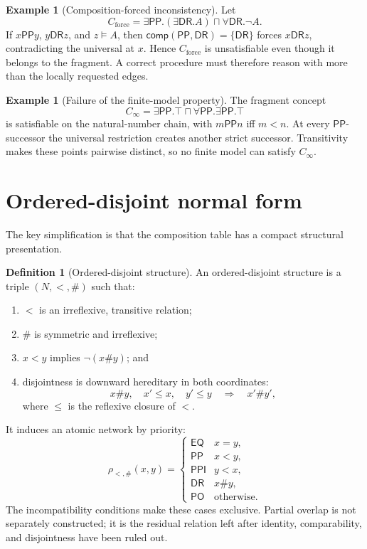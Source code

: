 \documentclass[11pt]{article}
\theoremstyle{plain}
\theoremstyle{definition}
\newtheorem{definition}[theorem]{Definition}
\newtheorem{example}[theorem]{Example}
\theoremstyle{remark}
\newcommand{\EQ}{\ensuremath{\mathsf{EQ}}}
\newcommand{\PP}{\ensuremath{\mathsf{PP}}}
\newcommand{\PPI}{\ensuremath{\mathsf{PPI}}}
\newcommand{\PO}{\ensuremath{\mathsf{PO}}}
\newcommand{\DR}{\ensuremath{\mathsf{DR}}}
\newcommand{\comp}{\ensuremath{\mathsf{comp}}}
\begin{document}
\begin{example}[Composition-forced inconsistency]
Let
\[
 C_{\mathrm{force}}=
   \exists\PP.(\exists\DR.A)\sqcap\forall\DR.\neg A.
\]
If $x\PP y$, $y\DR z$, and $z\models A$, then
$\comp(\PP,\DR)=\{\DR\}$ forces $x\DR z$, contradicting the universal at
$x$.  Hence $C_{\mathrm{force}}$ is unsatisfiable even though it belongs to
the fragment.  A correct procedure must therefore reason with more than the
locally requested edges.
\end{example}

\begin{example}[Failure of the finite-model property]
The fragment concept
\[
 C_{\infty}=\exists\PP.\top\sqcap\forall\PP.\exists\PP.\top
\]
is satisfiable on the natural-number chain, with $m\PP n$ iff $m<n$.
At every $\PP$-successor the universal restriction creates another strict
successor.  Transitivity makes these points pairwise distinct, so no finite
model can satisfy $C_{\infty}$.
\end{example}

\section{Ordered-disjoint normal form}
\label{sec:od}

The key simplification is that the composition table has a compact structural
presentation.

\begin{definition}[Ordered-disjoint structure]
An ordered-disjoint structure is a triple $(N,<,\#)$ such that:
\begin{enumerate}
  \item $<$ is an irreflexive, transitive relation;
  \item $\#$ is symmetric and irreflexive;
  \item $x<y$ implies $\neg(x\#y)$; and
  \item disjointness is downward hereditary in both coordinates:
  \[
      x\#y,\quad x'\leq x,\quad y'\leq y
      \quad\Longrightarrow\quad x'\#y',
  \]
  where $\leq$ is the reflexive closure of $<$.
\end{enumerate}
\end{definition}

It induces an atomic network by priority:
\[
 \rho_{<,\#}(x,y)=
 \begin{cases}
   \EQ  & x=y,\\
   \PP  & x<y,\\
   \PPI & y<x,\\
   \DR  & x\#y,\\
   \PO  & \text{otherwise.}
 \end{cases}
\]
The incompatibility conditions make these cases exclusive.  Partial overlap
is not separately constructed; it is the residual relation left after
identity, comparability, and disjointness have been ruled out.
\end{document}
